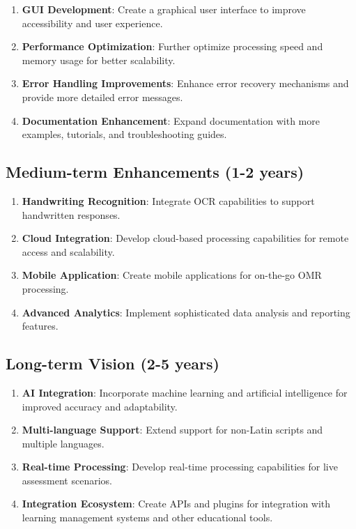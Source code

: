 \begin{enumerate}
\item \textbf{GUI Development}: Create a graphical user interface to improve accessibility and user experience.

\item \textbf{Performance Optimization}: Further optimize processing speed and memory usage for better scalability.

\item \textbf{Error Handling Improvements}: Enhance error recovery mechanisms and provide more detailed error messages.

\item \textbf{Documentation Enhancement}: Expand documentation with more examples, tutorials, and troubleshooting guides.
\end{enumerate}

\subsection{Medium-term Enhancements (1-2 years)}

\begin{enumerate}
\item \textbf{Handwriting Recognition}: Integrate OCR capabilities to support handwritten responses.

\item \textbf{Cloud Integration}: Develop cloud-based processing capabilities for remote access and scalability.

\item \textbf{Mobile Application}: Create mobile applications for on-the-go OMR processing.

\item \textbf{Advanced Analytics}: Implement sophisticated data analysis and reporting features.
\end{enumerate}

\subsection{Long-term Vision (2-5 years)}

\begin{enumerate}
\item \textbf{AI Integration}: Incorporate machine learning and artificial intelligence for improved accuracy and adaptability.

\item \textbf{Multi-language Support}: Extend support for non-Latin scripts and multiple languages.

\item \textbf{Real-time Processing}: Develop real-time processing capabilities for live assessment scenarios.

\item \textbf{Integration Ecosystem}: Create APIs and plugins for integration with learning management systems and other educational tools.
\end{enumerate}

